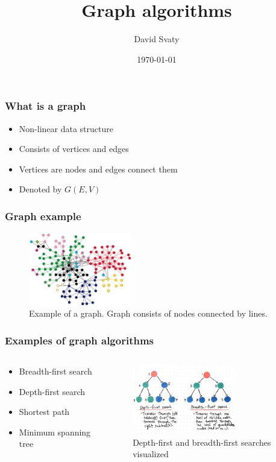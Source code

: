 \documentclass[pdf,fyma2]{beamer}
\title{Graph algorithms}
\author{David Svaty}
\institute{ FIT BUT }
\date{\today}
\begin{document}
    
\frame{\titlepage}

\begin{frame}
    \frametitle{What is a graph}
    
    \begin{itemize}
        \item Non-linear data structure
        \pause
        \item Consists of vertices and edges
        \pause
        \item Vertices are nodes and edges connect them
        \pause
        \item Denoted by $G(E,V)$ 
    \end{itemize}
\end{frame}

\begin{frame}
    \frametitle{Graph example}
    \begin{figure}
        \includegraphics[width=170px]{img/graph-algorithms1.png}
        \caption{Example of a graph. Graph consists of nodes connected by lines.}
    \end{figure}
\end{frame}

\begin{frame}
    \frametitle{Examples of graph algorithms}
    \begin{columns} 


    \begin{column}{0.5\textwidth}
    \begin{itemize}
        \item Breadth-first search
        \pause
        \item Depth-first search
        \pause
        \item Shortest path
        \pause
        \item Minimum spanning tree 
    \end{itemize}    
    \end{column}
    \pause
    \begin{column}{0.5\textwidth}
    \begin{figure}
        \includegraphics[width=170px]{img/searches.jpg}
        \caption{Depth-first and breadth-first searches visualized}
    \end{figure}    
    \end{column}

    \end{columns}
\end{frame}
\end{document}
